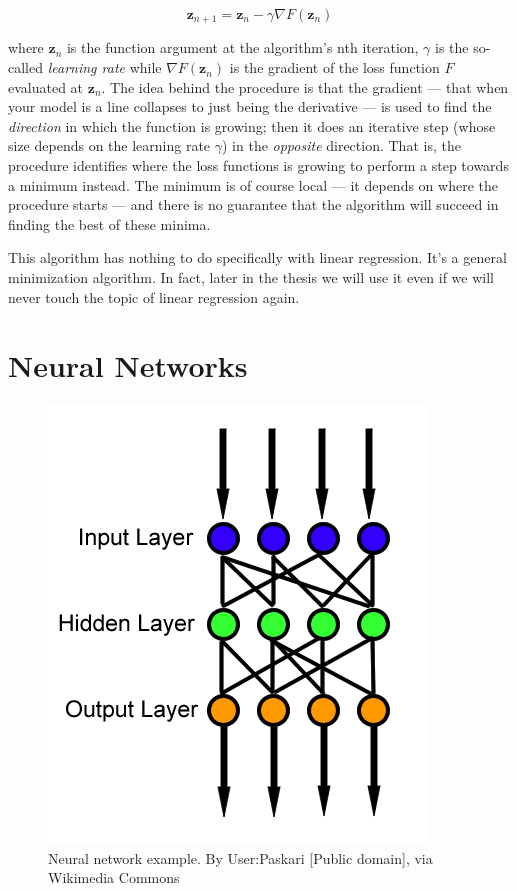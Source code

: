 \begin{equation}
  \boldsymbol{z}_{n+1} = \boldsymbol{z}_n - \gamma
  \nabla{F}(\boldsymbol{z}_n)
\end{equation}

where $\boldsymbol{z}_n$ is the function argument at the algorithm's
nth iteration, $\gamma$ is the so-called \emph{learning rate} while
$\nabla{F}(\boldsymbol{z}_n)$ is the gradient of the loss function $F$
evaluated at $\boldsymbol{z}_n$. The idea behind the procedure is that
the gradient --- that when your model is a line collapses to just
being the derivative --- is used to find the \emph{direction} in which
the function is growing; then it does an iterative step (whose size
depends on the learning rate $\gamma$) in the \emph{opposite}
direction. That is, the procedure identifies where the loss functions
is growing to perform a step towards a minimum instead. The minimum is
of course local --- it depends on where the procedure starts --- and
there is no guarantee that the algorithm will succeed in finding the
best of these minima.

This algorithm has nothing to do specifically with linear regression.
It's a general minimization algorithm. In fact, later in the thesis
we will use it even if we will never touch the topic of linear regression
again.

\section{Neural Networks}
\label{sec:neural-networks}

\begin{figure}
  \centering
  \includegraphics[width=0.5\linewidth]{Images/wikipedia-neural-network.png}
  \caption{Neural network example. By User:Paskari [Public domain], via
    Wikimedia Commons}
  \label{fig:wikipedia-neural-network}
\end{figure}

